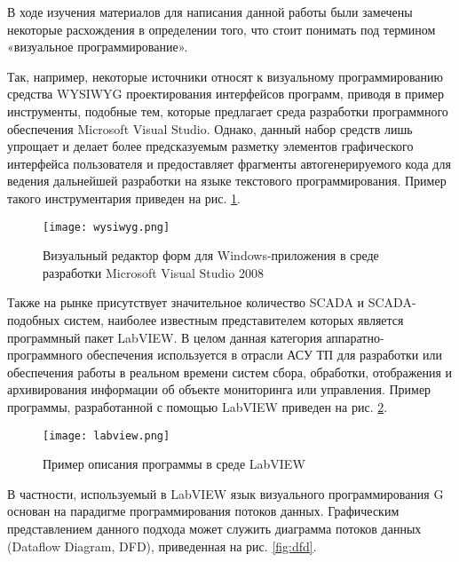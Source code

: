 
В ходе изучения материалов для написания данной работы были замечены некоторые расхождения в определении того, что стоит понимать под термином «визуальное программирование». 

Так, например, некоторые источники относят к визуальному программированию средства WYSIWYG проектирования интерфейсов программ, приводя в пример инструменты, подобные тем, которые предлагает среда разработки программного обеспечения Microsoft Visual Studio. Однако, данный набор средств лишь упрощает и делает более предсказуемым разметку элементов графического интерфейса пользователя и предоставляет фрагменты автогенерируемого кода для ведения дальнейшей разработки на языке текстового программирования. Пример такого инструментария приведен на рис. \ref{fig:wysiwyg}.


\begin{figure}[htbp]
	\centering
	\texttt{[image: wysiwyg.png]}
	\caption{Визуальный редактор форм для Windows-приложения в среде разработки Microsoft Visual Studio 2008}%
	\label{fig:wysiwyg}
\end{figure}

Также на рынке присутствует значительное количество SCADA и SCADA-подобных систем, наиболее известным представителем которых является программный пакет LabVIEW. В целом данная категория аппаратно-программного обеспечения используется в отрасли АСУ ТП для разработки или обеспечения работы в реальном времени систем сбора, обработки, отображения и архивирования информации об объекте мониторинга или управления. Пример программы, разработанной с помощью LabVIEW приведен на рис. \ref{fig:labview}.


\begin{figure}[htbp]
	\centering
	\texttt{[image: labview.png]}
	\caption{Пример описания программы в среде LabVIEW}%
	\label{fig:labview}
\end{figure}

В частности, используемый в LabVIEW язык визуального программирования G основан на парадигме программирования потоков данных. Графическим представлением данного подхода может служить диаграмма потоков данных (Dataflow Diagram, DFD), приведенная на рис. \ref{fig:dfd}.

